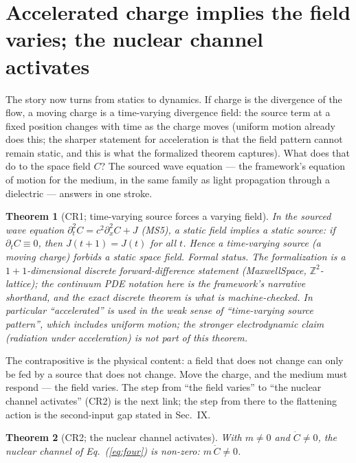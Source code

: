 \documentclass[aps,prd,preprint,superscriptaddress,amsmath,amssymb]{revtex4-2}
\newtheorem{theorem}{Theorem}[section]
\begin{document}
\section{Accelerated charge implies the field varies; the nuclear
channel activates}
\label{sec:accel}

The story now turns from statics to dynamics.  If charge is the
divergence of the flow, a moving charge is a time-varying
divergence field: the source term at a fixed position changes with
time as the charge moves (uniform motion already does this; the
sharper statement for acceleration is that the field pattern cannot
remain static, and this is what the formalized theorem captures).
What does that do to the space field $C$?  The sourced wave equation
--- the framework's equation of motion for the medium, in the same
family as light propagation through a dielectric
\cite{gordon1923lichtfortpflanzung} --- answers in one stroke.

\begin{theorem}[CR1; time-varying source forces a varying field]
\label{thm:cr1}
In the sourced wave equation
$\partial_t^2 C=c^2\partial_x^2 C+J$ (MS5), a static field implies a
static source: if $\partial_t C\equiv 0$, then $J(t{+}1)=J(t)$ for all
$t$.  Hence a time-varying source (a moving charge) forbids a
static space field.
\emph{Formal status.}  The formalization is a $1{+}1$-dimensional
discrete forward-difference statement (MaxwellSpace, $\mathbb
Z^2$-lattice); the continuum PDE notation here is the framework's
narrative shorthand, and the exact discrete theorem is what is
machine-checked.  In particular ``accelerated'' is used in the weak
sense of ``time-varying source pattern'', which includes uniform
motion; the stronger electrodynamic claim (radiation under
acceleration) is not part of this theorem.
\end{theorem}

The contrapositive is the physical content: a field that does not
change can only be fed by a source that does not change.  Move the
charge, and the medium must respond --- the field varies.  The step
from ``the field varies'' to ``the nuclear channel activates''
(CR2) is the next link; the step from there to the flattening
action is the second-input gap stated in Sec.~IX.

\begin{theorem}[CR2; the nuclear channel activates]
\label{thm:cr2}
With $m\neq 0$ and $\dot C\neq 0$, the nuclear channel of
Eq.~(\ref{eq:four}) is non-zero: $m\,\dot C\neq 0$.
\end{theorem}
\end{document}
